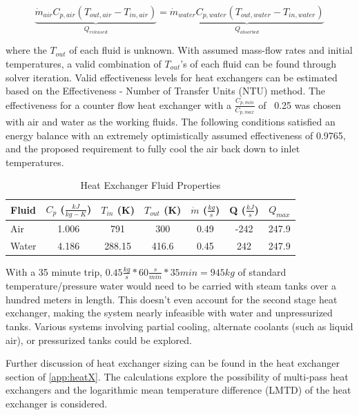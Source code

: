 \documentclass[heading.tex]{subfiles}
\begin{document}
\begin{equation}
\underbrace{\dot{m}_{air} C_{p, air} (T_{out, air} - T_{in, air})}_{{Q}_{released}}  = \underbrace{\dot{m}_{water} C_{p,water} (T_{out, water} - T_{in, water})}_{{Q}_{absorbed}}
\end{equation}

where the $T_{out}$  of each fluid is unknown. With assumed mass-flow rates and initial temperatures, a valid combination of $T_{out}$'s of
each fluid can be found through solver iteration. Valid effectiveness levels for heat exchangers can be estimated based on the
Effectiveness - Number of Transfer Units (NTU) method. 
The effectiveness for a counter flow heat exchanger with a $\frac{C_{p,min}}{C_{p,max}}$ of ~0.25 was chosen with air and water as the working fluids. 
The following conditions satisfied an energy balance with an extremely optimistically assumed effectiveness of 0.9765,
and the proposed requirement to fully cool the air back down to inlet temperatures.


\begin{table}
    \centering
    \caption{Heat Exchanger Fluid Properties}
    \label{tab:HeatEx}
    \begin{tabular}{l  c  c  c  c  c  c} 
        \hline
        Fluid & $C_{p}$ ($\frac{kJ}{kg-K}$)& $T_{in}$ (K) & $T_{out}$ (K) & $\dot{m}$ ($\frac{kg}{s}$) & Q ($\frac{kJ}{s}$) & $Q_{max}$\\ \hline 
        Air & 1.006 & 791 & 300 & 0.49 & -242 & 247.9\\ 
        Water & 4.186 & 288.15 & 416.6 &0.45 & 242 & 247.9\\ \hline
    \end{tabular}
\end{table}

With a 35 minute trip, $0.45 \frac{kg}{s} * 60 \frac{s}{min} * 35min = 945 kg$ of standard temperature/pressure water would need to be carried 
with steam tanks over a hundred meters in length. This doesn't even account for the second stage heat exchanger, making the system nearly infeasible
with water and unpressurized tanks. Various systems involving partial cooling, alternate coolants (such as liquid air), or pressurized tanks could be explored.

Further discussion of heat exchanger sizing can be found in the heat exchanger section of \cref{app:heatX}.
The calculations explore the possibility of multi-pass heat exchangers
and the logarithmic mean temperature difference (LMTD) of the heat exchanger is considered.
\cite{Cengal}
\cite{Turns}
\end{document}
